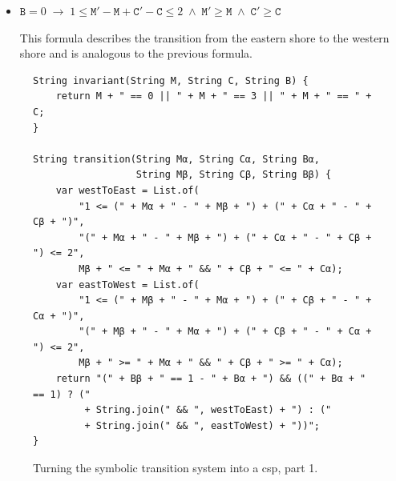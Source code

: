 \begin{enumerate}[(a)]
\begin{itemize}
            The condition $\mathtt{M}' \leq \mathtt{M}$ is true because when missionaries are traveling from
            the western shore to the eastern shore, the number of missionaries on the western shore cannot
            increase.  Similarly,  $\mathtt{C}' \leq \mathtt{C}$ has to be true.
      \item $\mathtt{B} = 0 \;\rightarrow\; 1 \leq \mathtt{M}' - \mathtt{M}  + \mathtt{C}' - \mathtt{C} \leq 2 \;\wedge\;
            \mathtt{M}' \geq \mathtt{M} \;\wedge\; \mathtt{C}' \geq \mathtt{C}$

            This formula describes the transition from the eastern shore to the western shore and is analogous
            to the previous formula. \eox
      \end{itemize}
\end{enumerate}

\begin{figure}[!ht]
\centering
\begin{verbatim}
String invariant(String M, String C, String B) {
    return M + " == 0 || " + M + " == 3 || " + M + " == " + C;
}
  
String transition(String Mα, String Cα, String Bα,
                  String Mβ, String Cβ, String Bβ) {
    var westToEast = List.of(
        "1 <= (" + Mα + " - " + Mβ + ") + (" + Cα + " - " + Cβ + ")",
        "(" + Mα + " - " + Mβ + ") + (" + Cα + " - " + Cβ + ") <= 2",
        Mβ + " <= " + Mα + " && " + Cβ + " <= " + Cα);
    var eastToWest = List.of(
        "1 <= (" + Mβ + " - " + Mα + ") + (" + Cβ + " - " + Cα + ")",
        "(" + Mβ + " - " + Mα + ") + (" + Cβ + " - " + Cα + ") <= 2",
        Mβ + " >= " + Mα + " && " + Cβ + " >= " + Cα);
    return "(" + Bβ + " == 1 - " + Bα + ") && ((" + Bα + " == 1) ? ("
         + String.join(" && ", westToEast) + ") : ("
         + String.join(" && ", eastToWest) + "))";
}
\end{verbatim}
\vspace*{-0.3cm}
\caption{Turning the symbolic transition system into a \Gls{csp}, part 1.}
\label{fig:Missionaries-STS.ipynb}
\end{figure}

